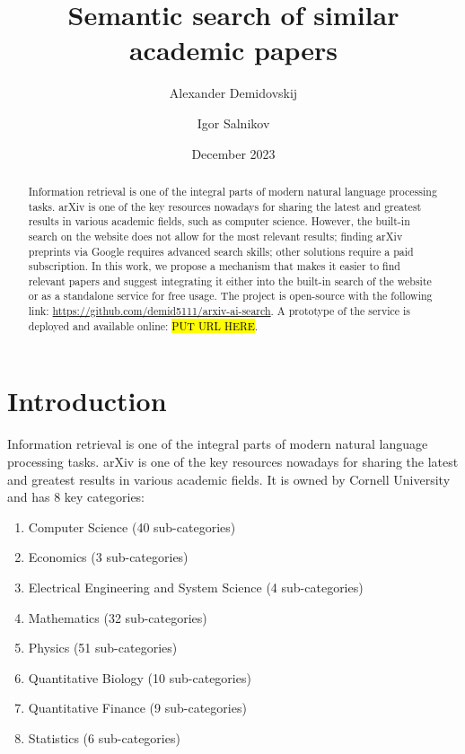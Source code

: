 \documentclass{article}
\title{Semantic search of similar academic papers}
\author{Alexander Demidovskij \and Igor Salnikov}
\date{December 2023}
\begin{document}
\maketitle

\begin{abstract}
    Information retrieval is one of the integral parts of modern natural language processing tasks. arXiv is one of the key resources nowadays for sharing the latest and greatest results in various academic fields, such as computer science. However, the built-in search on the website does not allow for the most relevant results; finding arXiv preprints via Google requires advanced search skills; other solutions require a paid subscription. In this work, we propose a mechanism that makes it easier to find relevant papers and suggest integrating it either into the built-in search of the website or as a standalone service for free usage. The project is open-source with the following link: \url{https://github.com/demid5111/arxiv-ai-search}. A prototype of the service is deployed and available online: \hl{PUT URL HERE}.
\end{abstract}

\section{Introduction}
    Information retrieval is one of the integral parts of modern natural language processing tasks. arXiv is one of the key resources nowadays for sharing the latest and greatest results in various academic fields. It is owned by Cornell University and has 8 key categories:
    
    \begin{enumerate}
        \item Computer Science (40 sub-categories)
        \item Economics (3 sub-categories)
        \item Electrical Engineering and System Science (4 sub-categories)
        \item Mathematics (32 sub-categories)
        \item Physics (51 sub-categories)
        \item Quantitative Biology (10 sub-categories)
        \item Quantitative Finance (9 sub-categories)
        \item Statistics (6 sub-categories)
    \end{enumerate}
    
\end{document}
